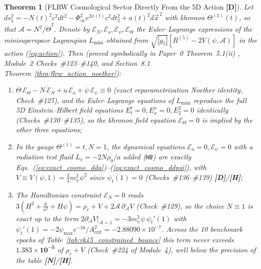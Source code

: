 \documentclass[11pt,a4paper]{article}
\newcommand{\catD}{\textbf{\textcolor{blue!75!black}{[D]}}}
\newcommand{\catH}{\textbf{\textcolor{orange!85!black}{[H]}}}
\newcommand{\catN}{\textbf{\textcolor{teal!75!black}{[N]}}}
\newtheorem{theorem}{Theorem}[section]
\theoremstyle{definition}
\theoremstyle{remark}
\begin{document}
\begin{theorem}[FLRW Cosmological Sector Directly From the 5D Action \catD]
\label{thm:flrw}
Let $ds_5^2 = -N(t)^2 c^2 dt^2 - \Phi_{\infty}^2 e^{2\psi(t)} c^2 dt_2^2 + a(t)^2 d\vec{x}^{\,2}$ with khronon $\Theta^{(1)}(t)$, so that $\mathcal{A} = N^2/\dot{\Theta}^2$. Denote by $\mathcal{E}_N, \mathcal{E}_a, \mathcal{E}_{\psi}, \mathcal{E}_{\Theta}$ the Euler--Lagrange expressions of the minisuperspace Lagrangian $L_{\text{mini}}$ obtained from $\sqrt{|g_5|}[R^{(5)} - 2V(\psi, \mathcal{A})]$ in the action (\ref{eq:action}). Then (proved symbolically in Paper~0 Theorem~5.1(ii) \cite{JV_Paper0}, Module~2 Checks~\#123--\#140, and Section~8.1 Theorem~\ref{thm:flrw_action_noether}):
\begin{enumerate}
  \item[\textnormal{(a)}] $\dot{\Theta}\,\mathcal{E}_{\Theta} - N\,\dot{\mathcal{E}}_N + \dot{a}\,\mathcal{E}_a + \dot{\psi}\,\mathcal{E}_{\psi} \equiv 0$ (exact reparametrization Noether identity, Check~\#127), and the Euler--Lagrange equations of $L_{\text{mini}}$ reproduce the full 5D Einstein--Hilbert field equations $E^t_t = 0, E^x_x = 0, E^2_2 = 0$ identically (Checks~\#130--\#135), so the khronon field equation $\mathcal{E}_{\Theta} = 0$ is implied by the other three equations;
  \item[\textnormal{(b)}] In the gauge $\Theta^{(1)} = t, N = 1$, the dynamical equations $\mathcal{E}_a = 0, \mathcal{E}_{\psi} = 0$ with a radiation test fluid $L_r = -2N\rho_0/a$ added (\texttt{H8}) are exactly Eqs.~(\ref{eq:exact_cosmo_dda})--(\ref{eq:exact_cosmo_ddpsi}), with $V \equiv V(\psi, 1) = \frac{3}{4}m_{\psi}^2\psi^2$ since $\psi_t(1) = 0$ (Checks~\#136--\#139) \catD/\catH;
  \item[\textnormal{(c)}] The Hamiltonian constraint $\mathcal{E}_N = 0$ reads $3(H^2 + \frac{k}{a^2} + H\dot{\psi}) = \rho_r + V + 2\mathcal{A}\,\partial_{\mathcal{A}}V$ (Check~\#129), so the choice $N \equiv 1$ is exact up to the term $2\partial_{\mathcal{A}}V|_{\mathcal{A}=1} = -3 m_{\psi}^2\psi\,\psi_t'(1)$ with $\psi_t'(1) = -2\psi_{\max}e^{-16}/A_{\text{crit}}^2 = -2.88090 \times 10^{-7}$. Across the 10 benchmark epochs of Table~\ref{tab:rk45_constrained_bounce} this term never exceeds $\mathbf{1.383 \times 10^{-5}}$ of $\rho_r + V$ (Check~\#224 of Module~4), well below the precision of the table \catN/\catH.
\end{enumerate}
\end{theorem}
\end{document}
